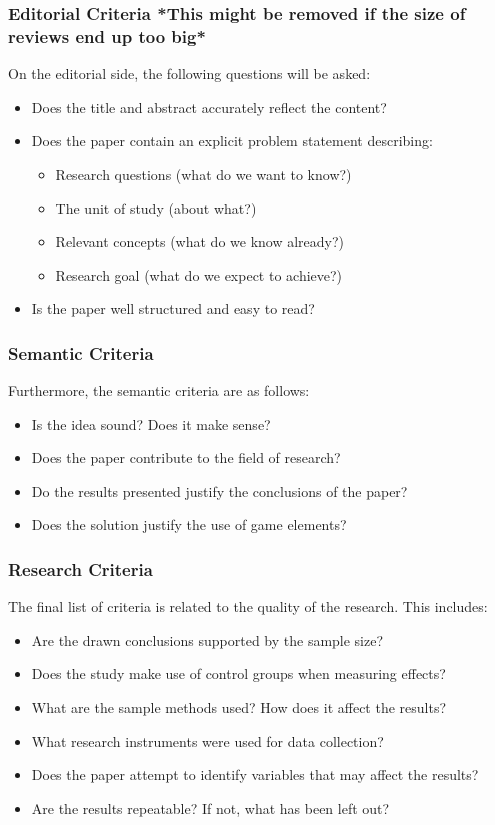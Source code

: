 \subsubsection{Editorial Criteria *This might be removed if the size of reviews end up too big*}
On the editorial side, the following questions will be asked:
\begin{itemize}
    \item Does the title and abstract accurately reflect the content?
    \item Does the paper contain an explicit problem statement describing:
    \begin{itemize}
        \item Research questions (what do we want to know?)
        \item The unit of study (about what?)
        \item Relevant concepts (what do we know already?)
        \item Research goal (what do we expect to achieve?)
    \end{itemize}
    \item Is the paper well structured and easy to read?
\end{itemize}
\fi

\subsubsection{Semantic Criteria}
Furthermore, the semantic criteria are as follows: 
\begin{itemize}
    \item Is the idea sound? Does it make sense?
    \item Does the paper contribute to the field of research?
    \item Do the results presented justify the conclusions of the paper?
    \item Does the solution justify the use of game elements?
\end{itemize}

\subsubsection{Research Criteria}
The final list of criteria is related to the quality of the research. This includes: 
\begin{itemize}
    \item Are the drawn conclusions supported by the sample size?
    \item Does the study make use of control groups when measuring effects?
    \item What are the sample methods used? How does it affect the results?
    \item What research instruments were used for data collection?
    \item Does the paper attempt to identify variables that may affect the results?
    \item Are the results repeatable? If not, what has been left out?
\end{itemize}

